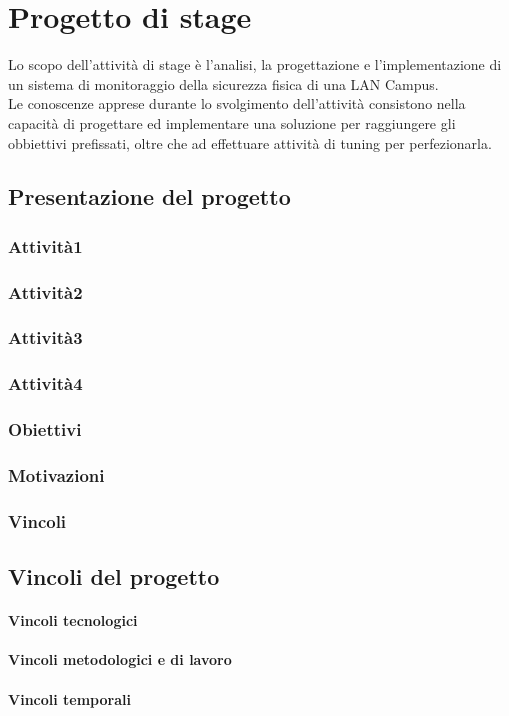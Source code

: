 \documentclass[Tesi.tex]{subfiles}
\begin{document}
\chapter{Progetto di stage}
Lo scopo dell'attività di stage è l’analisi, la progettazione e l'implementazione di un sistema di monitoraggio della sicurezza fisica di una LAN Campus. \\
Le conoscenze apprese durante lo svolgimento dell'attività consistono nella capacità di progettare ed implementare una soluzione per raggiungere gli obbiettivi prefissati, oltre che ad effettuare attività di tuning per perfezionarla.

\section{Presentazione del progetto}


\subsection{Attività1}

\subsection{Attività2}

\subsection{Attività3}

\subsection{Attività4}

\subsection{Obiettivi}

\subsection{Motivazioni}
\subsection{Vincoli}

\section{Vincoli del progetto}
\subsubsection{Vincoli tecnologici}

\subsubsection{Vincoli metodologici e di lavoro}

\subsubsection{Vincoli temporali}
\end{document}

